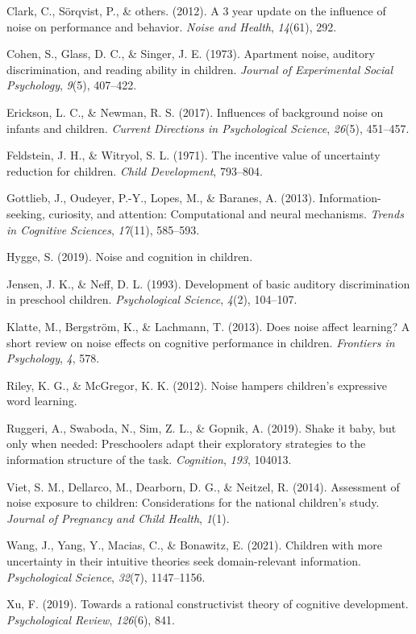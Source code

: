 \documentclass[10pt, letterpaper]{article}
\begin{document}
\leavevmode\hypertarget{ref-clark20123}{}%
Clark, C., Sörqvist, P., \& others. (2012). A 3 year update on the
influence of noise on performance and behavior. \emph{Noise and Health},
\emph{14}(61), 292.

\leavevmode\hypertarget{ref-cohen1973}{}%
Cohen, S., Glass, D. C., \& Singer, J. E. (1973). Apartment noise,
auditory discrimination, and reading ability in children. \emph{Journal
of Experimental Social Psychology}, \emph{9}(5), 407--422.

\leavevmode\hypertarget{ref-erickson2017}{}%
Erickson, L. C., \& Newman, R. S. (2017). Influences of background noise
on infants and children. \emph{Current Directions in Psychological
Science}, \emph{26}(5), 451--457.

\leavevmode\hypertarget{ref-feldstein1971}{}%
Feldstein, J. H., \& Witryol, S. L. (1971). The incentive value of
uncertainty reduction for children. \emph{Child Development}, 793--804.

\leavevmode\hypertarget{ref-gottlieb2013}{}%
Gottlieb, J., Oudeyer, P.-Y., Lopes, M., \& Baranes, A. (2013).
Information-seeking, curiosity, and attention: Computational and neural
mechanisms. \emph{Trends in Cognitive Sciences}, \emph{17}(11),
585--593.

\leavevmode\hypertarget{ref-hygge2019}{}%
Hygge, S. (2019). Noise and cognition in children.

\leavevmode\hypertarget{ref-jensen1993}{}%
Jensen, J. K., \& Neff, D. L. (1993). Development of basic auditory
discrimination in preschool children. \emph{Psychological Science},
\emph{4}(2), 104--107.

\leavevmode\hypertarget{ref-klatte2013}{}%
Klatte, M., Bergström, K., \& Lachmann, T. (2013). Does noise affect
learning? A short review on noise effects on cognitive performance in
children. \emph{Frontiers in Psychology}, \emph{4}, 578.

\leavevmode\hypertarget{ref-riley2012}{}%
Riley, K. G., \& McGregor, K. K. (2012). Noise hampers children's
expressive word learning.

\leavevmode\hypertarget{ref-ruggeri2019}{}%
Ruggeri, A., Swaboda, N., Sim, Z. L., \& Gopnik, A. (2019). Shake it
baby, but only when needed: Preschoolers adapt their exploratory
strategies to the information structure of the task. \emph{Cognition},
\emph{193}, 104013.

\leavevmode\hypertarget{ref-viet2014}{}%
Viet, S. M., Dellarco, M., Dearborn, D. G., \& Neitzel, R. (2014).
Assessment of noise exposure to children: Considerations for the
national children's study. \emph{Journal of Pregnancy and Child Health},
\emph{1}(1).

\leavevmode\hypertarget{ref-wang2021}{}%
Wang, J., Yang, Y., Macias, C., \& Bonawitz, E. (2021). Children with
more uncertainty in their intuitive theories seek domain-relevant
information. \emph{Psychological Science}, \emph{32}(7), 1147--1156.

\leavevmode\hypertarget{ref-xu2019}{}%
Xu, F. (2019). Towards a rational constructivist theory of cognitive
development. \emph{Psychological Review}, \emph{126}(6), 841.


\end{document}
